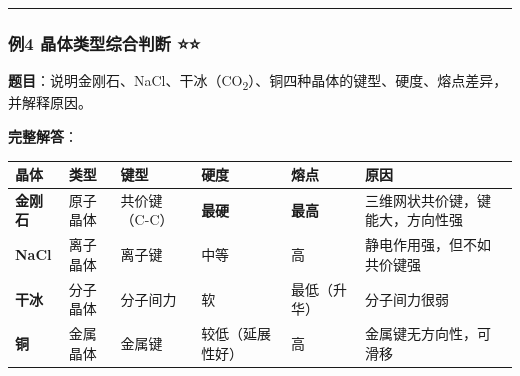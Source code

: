 \begin{center}\rule{0.5\linewidth}{0.5pt}\end{center}

\subsubsection{例4 晶体类型综合判断 ⭐⭐}\label{ux4f8b4-ux6676ux4f53ux7c7bux578bux7efcux5408ux5224ux65ad}

\textbf{题目}：说明金刚石、NaCl、干冰（CO\textsubscript{2}）、铜四种晶体的键型、硬度、熔点差异，并解释原因。

\textbf{完整解答}：

{\def\LTcaptype{none} %
\begin{longtable}[]{@{}
  >{\raggedright\arraybackslash}p{}
  >{\raggedright\arraybackslash}p{}
  >{\raggedright\arraybackslash}p{}
  >{\centering\arraybackslash}p{}
  >{\centering\arraybackslash}p{}
  >{\raggedright\arraybackslash}p{}@{}}
\toprule\noalign{}
\begin{minipage}[b]{\linewidth}\raggedright
晶体
\end{minipage} & \begin{minipage}[b]{\linewidth}\raggedright
类型
\end{minipage} & \begin{minipage}[b]{\linewidth}\raggedright
键型
\end{minipage} & \begin{minipage}[b]{\linewidth}\centering
硬度
\end{minipage} & \begin{minipage}[b]{\linewidth}\centering
熔点
\end{minipage} & \begin{minipage}[b]{\linewidth}\raggedright
原因
\end{minipage} \\
\midrule\noalign{}
\endhead
\bottomrule\noalign{}
\endlastfoot
\textbf{金刚石} & 原子晶体 & 共价键（C-C） & \textbf{最硬} & \textbf{最高} & 三维网状共价键，键能大，方向性强 \\
\textbf{NaCl} & 离子晶体 & 离子键 & 中等 & 高 & 静电作用强，但不如共价键强 \\
\textbf{干冰} & 分子晶体 & 分子间力 & 软 & 最低（升华） & 分子间力很弱 \\
\textbf{铜} & 金属晶体 & 金属键 & 较低（延展性好） & 高 & 金属键无方向性，可滑移 \\
\end{longtable}
}


